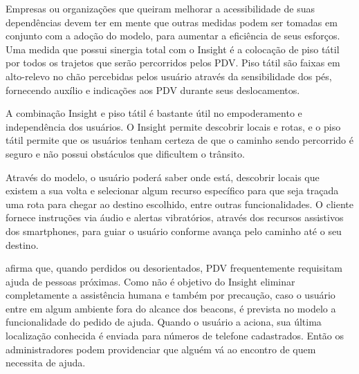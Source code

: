 \documentclass[twoside,english,brazilian]{UNISINOSartigo}
\begin{document}
Empresas ou organizações que queiram melhorar a acessibilidade de suas dependências devem ter em mente que outras medidas podem ser tomadas em conjunto com a adoção do modelo, para aumentar a eficiência de seus esforços. Uma medida que possui sinergia total com o Insight é a colocação de piso tátil por todos os trajetos que serão percorridos pelos PDV. Piso tátil são faixas em alto-relevo no chão percebidas pelos usuário através da sensibilidade dos pés, fornecendo auxílio e indicações aos PDV durante seus deslocamentos.

A combinação Insight e piso tátil é bastante útil no empoderamento e independência dos usuários. O Insight permite descobrir locais e rotas, e o piso tátil permite que os usuários tenham certeza de que o caminho sendo percorrido é seguro e não possui obstáculos que dificultem o trânsito.


Através do modelo, o usuário poderá saber onde está, descobrir locais que existem a sua volta e selecionar algum recurso específico para que seja traçada uma rota para chegar ao destino escolhido, entre outras funcionalidades. O cliente fornece instruções via áudio e alertas vibratórios, através dos recursos assistivos dos smartphones, para guiar o usuário conforme avança pelo caminho até o seu destino.

 afirma que, quando perdidos ou desorientados, PDV frequentemente requisitam ajuda de pessoas próximas. Como não é objetivo do Insight eliminar completamente a assistência humana e também por precaução, caso o usuário entre em algum ambiente fora do alcance dos beacons, é prevista no modelo a funcionalidade do pedido de ajuda. Quando o usuário a aciona, sua última localização conhecida é enviada para números de telefone cadastrados. Então os administradores podem providenciar que alguém vá ao encontro de quem necessita de ajuda.
\end{document}
